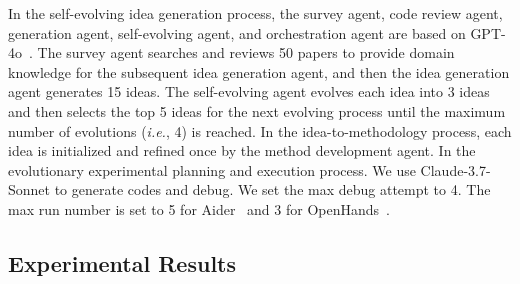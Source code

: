 In the self-evolving idea generation process, the survey agent, code review agent, generation agent, self-evolving agent, and orchestration agent are based on GPT-4o~\citep{hurst2024gpt4o}. The survey agent searches and reviews 50 papers to provide domain knowledge for the subsequent idea generation agent, and then the idea generation agent generates 15 ideas. The self-evolving agent evolves each idea into 3 ideas and then selects the top 5 ideas for the next evolving process until the maximum number of evolutions (\textit{i.e.}, 4) is reached. In the idea-to-methodology process, each idea is initialized and refined once by the method development agent. In the evolutionary experimental planning and execution process. We use Claude-3.7-Sonnet to generate codes and debug. We set the max debug attempt to 4. The max run number is set to 5 for Aider~\citep{aider} and 3 for OpenHands~\citep{wang2024openhands}.



\subsection{Experimental Results}
\label{sec:experimental_results}


\begin{table}[tbp]
\centering
\renewcommand{\arraystretch}{1.2}
\caption{Performance comparison across six types of scientific research tasks. We conduct experiments using 10 InternAgent-generated ideas for each task.}
\vspace{-6pt}
\label{tab:performance_comparison_sci}
\end{table}



